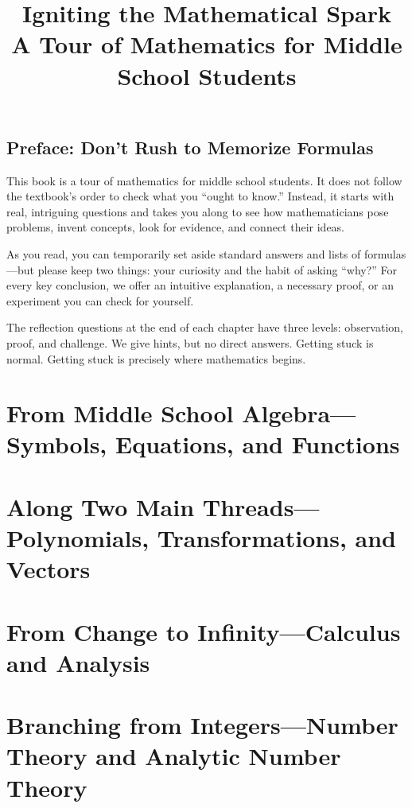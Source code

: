\documentclass[11pt,openany,fontset=none]{ctexbook}
\title{\sffamily\bfseries Igniting the Mathematical Spark\\[2mm] {\large A Tour of Mathematics for Middle School Students}}
\author{}
\date{}
\theoremstyle{definition}
\theoremstyle{plain}
\theoremstyle{remark}
\begin{document}
\frontmatter
\maketitle
\tableofcontents

\chapter*{Preface: Don't Rush to Memorize Formulas}
This book is a tour of mathematics for middle school students. It does not follow the textbook's order to check what you ``ought to know.'' Instead, it starts with real, intriguing questions and takes you along to see how mathematicians pose problems, invent concepts, look for evidence, and connect their ideas.

As you read, you can temporarily set aside standard answers and lists of formulas---but please keep two things: your curiosity and the habit of asking ``why?'' For every key conclusion, we offer an intuitive explanation, a necessary proof, or an experiment you can check for yourself.

The reflection questions at the end of each chapter have three levels: observation, proof, and challenge. We give hints, but no direct answers. Getting stuck is normal. Getting stuck is precisely where mathematics begins.

\mainmatter

\part{From Middle School Algebra---Symbols, Equations, and Functions}





\part{Along Two Main Threads---Polynomials, Transformations, and Vectors}





\part{From Change to Infinity---Calculus and Analysis}





\part{Branching from Integers---Number Theory and Analytic Number Theory}



\end{document}
